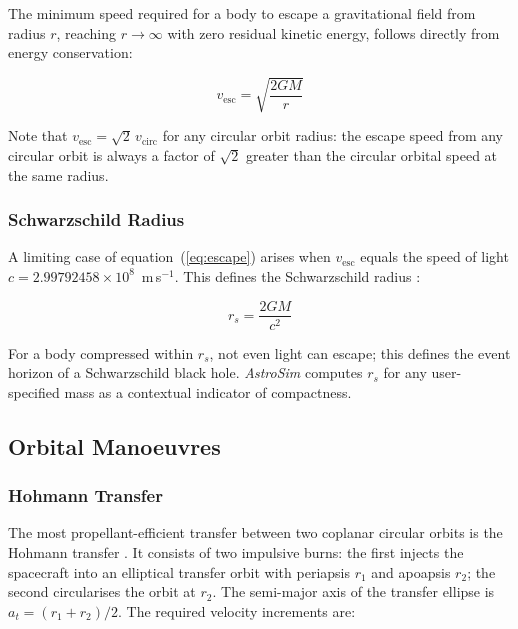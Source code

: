 \documentclass[10pt,a4paper]{article}
\begin{document}
The minimum speed required for a body to escape a gravitational field from
radius $r$, reaching $r \to \infty$ with zero residual kinetic energy, follows
directly from energy conservation:

\begin{formulabox}
\begin{equation}
v_{\mathrm{esc}} = \sqrt{\frac{2GM}{r}}
\label{eq:escape}
\end{equation}
\end{formulabox}

Note that $v_{\mathrm{esc}} = \sqrt{2}\, v_{\mathrm{circ}}$ for any circular
orbit radius: the escape speed from any circular orbit is always a factor of
$\sqrt{2}$ greater than the circular orbital speed at the same radius.

\subsubsection{Schwarzschild Radius}

A limiting case of equation~(\ref{eq:escape}) arises when $v_{\mathrm{esc}}$
equals the speed of light $c = 2.99792458 \times 10^8$~m\,s$^{-1}$.
This defines the Schwarzschild radius \citep{schwarzschild1916}:

\begin{equation}
r_s = \frac{2GM}{c^2}
\label{eq:schwarzschild}
\end{equation}

For a body compressed within $r_s$, not even light can escape; this defines
the event horizon of a Schwarzschild black hole.
\textit{AstroSim} computes $r_s$ for any user-specified mass as a contextual
indicator of compactness.

\subsection{Orbital Manoeuvres}

\subsubsection{Hohmann Transfer}

The most propellant-efficient transfer between two coplanar circular orbits
is the Hohmann transfer \citep{hohmann1925}.
It consists of two impulsive burns: the first injects the spacecraft into an
elliptical transfer orbit with periapsis $r_1$ and apoapsis $r_2$; the second
circularises the orbit at $r_2$.
The semi-major axis of the transfer ellipse is $a_t = (r_1 + r_2)/2$.
The required velocity increments are:
\end{document}
